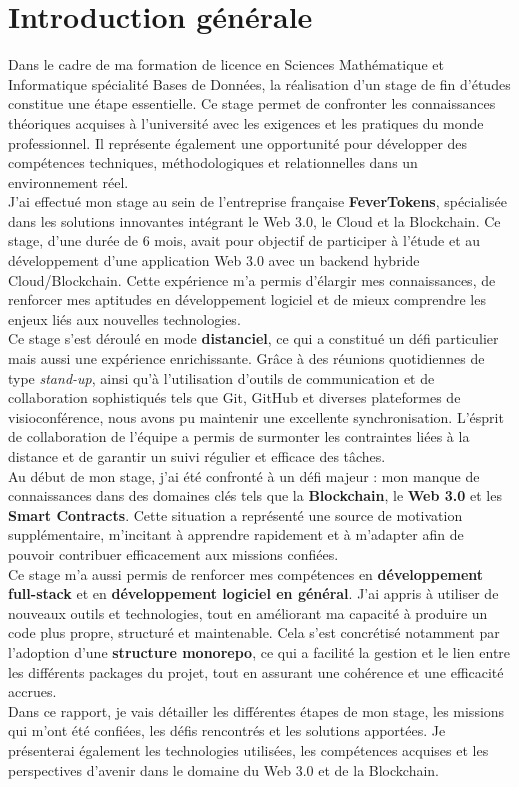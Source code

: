 \chapter*{Introduction générale}
Dans le cadre de ma formation de licence en Sciences Mathématique et Informatique spécialité Bases de Données, la réalisation d'un stage de fin d'études constitue une étape essentielle. Ce stage permet de confronter les connaissances théoriques acquises à l'université avec les exigences et les pratiques du monde professionnel. Il représente également une opportunité pour développer des compétences techniques, méthodologiques et relationnelles dans un environnement réel.\\[5mm]
J'ai effectué mon stage au sein de l'entreprise française \textbf{\textcolor{ftRed}{FeverTokens}}, spécialisée dans les solutions innovantes intégrant le Web 3.0, le Cloud et la Blockchain. Ce stage, d'une durée de 6 mois, avait pour objectif de participer à l'étude et au développement d'une application Web 3.0 avec un backend hybride Cloud/Blockchain. Cette expérience m'a permis d'élargir mes connaissances, de renforcer mes aptitudes en développement logiciel et de mieux comprendre les enjeux liés aux nouvelles technologies.
\\[5mm]
Ce stage s'est déroulé en mode \textbf{distanciel}, ce qui a constitué un défi particulier mais aussi une expérience enrichissante. Grâce à des réunions quotidiennes de type \textit{stand-up}, ainsi qu'à l'utilisation d'outils de communication et de collaboration sophistiqués tels que Git, GitHub et diverses plateformes de visioconférence, nous avons pu maintenir une excellente synchronisation. L'\' esprit de collaboration de l'équipe a permis de surmonter les contraintes liées à la distance et de garantir un suivi régulier et efficace des tâches.
\\[5mm]
Au début de mon stage,  j'ai été confronté à un défi majeur : mon manque de connaissances dans des domaines clés tels que la \textbf{Blockchain}, le \textbf{Web 3.0} et les \textbf{Smart Contracts}. Cette situation a représenté une source de motivation supplémentaire, m'incitant à apprendre rapidement et à m'adapter afin de pouvoir contribuer efficacement aux missions confiées.\\[5mm]
Ce stage m'a aussi permis de renforcer mes compétences en \textbf{développement full-stack} et en \textbf{développement logiciel en général}. J'ai appris à utiliser de nouveaux outils et technologies, tout en améliorant ma capacité à produire un code plus propre, structuré et maintenable. Cela s'est concrétisé notamment par l'adoption d'une \textbf{structure monorepo}, ce qui a facilité la gestion et le lien entre les différents packages du projet, tout en assurant une cohérence et une efficacité accrues.\\[5mm]
Dans ce rapport, je vais détailler les différentes étapes de mon stage, les missions qui 
m'ont été confiées, les défis rencontrés et les solutions apportées. Je présenterai également les technologies utilisées, les compétences acquises et les perspectives d'avenir dans le domaine du Web 3.0 et de la Blockchain.\\[5mm]
